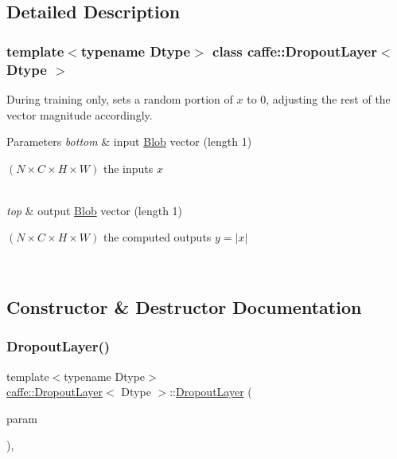 \subsection{Detailed Description}
\subsubsection*{template$<$typename Dtype$>$\newline
class caffe\+::\+Dropout\+Layer$<$ Dtype $>$}

During training only, sets a random portion of $x$ to 0, adjusting the rest of the vector magnitude accordingly. 


\begin{DoxyParams}{Parameters}
{\em bottom} & input \mbox{\hyperlink{classcaffe_1_1_blob}{Blob}} vector (length 1)
\begin{DoxyEnumerate}
\item $ (N \times C \times H \times W) $ the inputs $ x $ 
\end{DoxyEnumerate}\\
\hline
{\em top} & output \mbox{\hyperlink{classcaffe_1_1_blob}{Blob}} vector (length 1)
\begin{DoxyEnumerate}
\item $ (N \times C \times H \times W) $ the computed outputs $ y = |x| $ 
\end{DoxyEnumerate}\\
\hline
\end{DoxyParams}


\subsection{Constructor \& Destructor Documentation}
\mbox{\label{classcaffe_1_1_dropout_layer_a24cbddd4699b102a9555d3b8013c16d0}} 
\subsubsection{\texorpdfstring{Dropout\+Layer()}{DropoutLayer()}\hspace{0.1cm}{\footnotesize\ttfamily [1/2]}}
{\footnotesize\ttfamily template$<$typename Dtype$>$ \\
\mbox{\hyperlink{classcaffe_1_1_dropout_layer}{caffe\+::\+Dropout\+Layer}}$<$ Dtype $>$\+::\mbox{\hyperlink{classcaffe_1_1_dropout_layer}{Dropout\+Layer}} (\begin{DoxyParamCaption}\item[{const \mbox{\hyperlink{classcaffe_1_1_layer_parameter}{Layer\+Parameter}} \&}]{param }\end{DoxyParamCaption})\hspace{0.3cm}{\ttfamily [inline]}, {\ttfamily [explicit]}}


